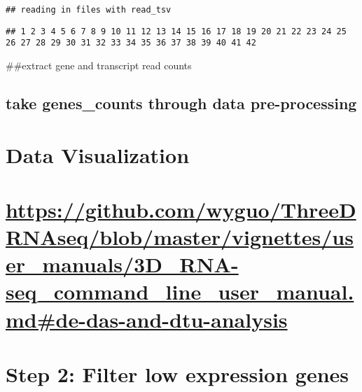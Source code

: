 \documentclass[]{article}
\newenvironment{Shaded}{\begin{snugshade}}{\end{snugshade}}
\newcommand{\NormalTok}[1]{#1}
\newcommand{\OperatorTok}[1]{\textcolor[rgb]{0.81,0.36,0.00}{\textbf{#1}}}
\newcommand{\StringTok}[1]{\textcolor[rgb]{0.31,0.60,0.02}{#1}}
\begin{document}
\begin{verbatim}
## reading in files with read_tsv
\end{verbatim}

\begin{verbatim}
## 1 2 3 4 5 6 7 8 9 10 11 12 13 14 15 16 17 18 19 20 21 22 23 24 25 26 27 28 29 30 31 32 33 34 35 36 37 38 39 40 41 42
\end{verbatim}

\#\#extract gene and transcript read counts

\hypertarget{take-genes_counts-through-data-pre-processing}{%
\subsection{take genes\_counts through data
pre-processing}\label{take-genes_counts-through-data-pre-processing}}

\begin{Shaded}
\end{Shaded}

\hypertarget{data-visualization}{%
\section{Data Visualization}\label{data-visualization}}

\hypertarget{httpsgithub.comwyguothreedrnaseqblobmastervignettesuser_manuals3d_rna-seq_command_line_user_manual.mdde-das-and-dtu-analysis}{%
\section{\texorpdfstring{\url{https://github.com/wyguo/ThreeDRNAseq/blob/master/vignettes/user_manuals/3D_RNA-seq_command_line_user_manual.md\#de-das-and-dtu-analysis}}{https://github.com/wyguo/ThreeDRNAseq/blob/master/vignettes/user\_manuals/3D\_RNA-seq\_command\_line\_user\_manual.md\#de-das-and-dtu-analysis}}\label{httpsgithub.comwyguothreedrnaseqblobmastervignettesuser_manuals3d_rna-seq_command_line_user_manual.mdde-das-and-dtu-analysis}}

\hypertarget{step-2-filter-low-expression-genes}{%
\section{Step 2: Filter low expression
genes}\label{step-2-filter-low-expression-genes}}
\end{document}
